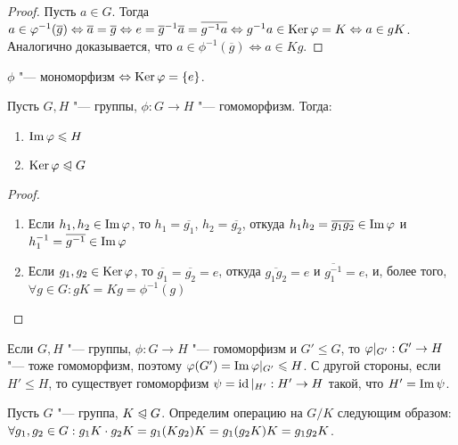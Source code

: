 \begin{proof}
	Пусть $a \in G$. Тогда $a \in \phi^{-1}(\overline{g}) \Leftrightarrow \overline{a} = \overline{g} \Leftrightarrow e \hm= \overline{g}^{-1}\overline{a} = \overline{g^{-1}a} \Leftrightarrow g^{-1}a \hm\in \ke\phi = K \Leftrightarrow a \in gK$. Аналогично доказывается, что $a \in \phi^{-1}(\overline{g}) \Leftrightarrow a \in Kg$.
\end{proof}

\begin{corollary}
	$\phi$ "--- мономорфизм $\Leftrightarrow \operatorname{Ker}\varphi = \{e\}$.
\end{corollary}

\begin{proposition}
	Пусть $G, H$ "--- группы, $\phi: G \to H$ "--- гомоморфизм. Тогда:
	\begin{enumerate}
		\item $\operatorname{Im}\varphi \leqslant H$
		\item $\operatorname{Ker}\varphi \trianglelefteqslant G$
	\end{enumerate}
\end{proposition}

\begin{proof}~
	\begin{enumerate}
		\item Если $h_1, h_2 \in \operatorname{Im}\varphi$, то $h_1 = \overline{g_1}$, $h_2 = \overline{g_2}$, откуда $h_1h_2 = \overline{g_1g_2} \hm\in \im\phi$ и $h_1^{-1} = \overline{g^{-1}} \in \operatorname{Im}\varphi$
		\item Если $g_1, g_2 \in \operatorname{Ker}\varphi$, то $\overline{g_1} = \overline{g_2} = e$, откуда $\overline{g_1g_2} = e$ и $\overline{g_1^{-1}} = e$, и, более того, $\forall g \in G: gK = Kg = \phi^{-1}(g)$
	\end{enumerate}
\end{proof}

\begin{note}
	Если $G, H$ "--- группы, $\phi: G \to H$ "--- гомоморфизм и $G' \le G$, то $\phi|_{G'}: G' \hm\to H$ "--- тоже гомоморфизм, поэтому $\phi(G') \hm= \im\phi|_{G'} \le H$. С другой стороны, если $H' \le H$, то существует гомоморфизм $\psi = \operatorname{id}|_{H'}: H' \to H$ такой, что $H' = \operatorname{Im}\psi$.
\end{note}

\begin{definition}
	Пусть $G$ "--- группа, $K \trianglelefteqslant G$. Определим операцию на $G / K$ следующим образом: $\forall g_1, g_2 \in G: g_1K\cdot g_2K \hm= g_1(Kg_2)K = g_1(g_2K)K = g_1g_2K$.
\end{definition}

